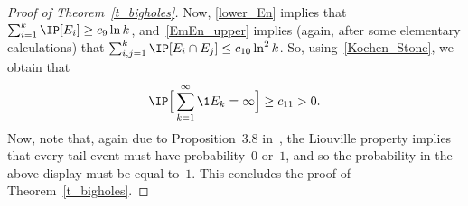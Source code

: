 \begin{proof}[Proof of Theorem~\ref{t_bigholes}]
Now, \eqref{lower_En} implies that $\sum_{i=1}^k\IP[E_i]\geq c_{9}\ln k$, and~\eqref{EmEn_upper} implies (again, after some elementary calculations) that $\sum_{i,j=1}^k\IP[E_i\cap E_j]\leq c_{10}\ln^2 k$. So, using~\eqref{Kochen--Stone}, we obtain that
\[
\IP\Big[\sum_{k=1}^\infty \1{E_k}=\infty\Big] \geq c_{11}>0.
\]
Now, note that, again due to Proposition~3.8 in~\cite[Chapter~2]{R84}, the Liouville property implies that every tail event must have probability~$0$ or~$1$, and so the probability in the above display must be equal to~$1$. This concludes the proof of Theorem~\ref{t_bigholes}.
\end{proof}

